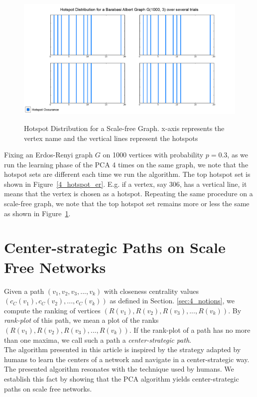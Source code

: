 \documentclass[10pt, conference, compsocconf]{IEEEtran}
\begin{document}
\begin{figure}[htp]
\begin{center}
\includegraphics[scale=0.17]{Results/barabasi.png}\\
\caption{Hotspot Distribution for a Scale-free Graph. x-axis represents the vertex name and the vertical lines represent the hotspots}
\label{4_hotspot_ba}
\end{center}
\end{figure}

Fixing an Erdos-Renyi graph $G$ on 1000 vertices with probability $p=0.3$, as we run the learning phase of the PCA 4 times on the same graph, we note that the hotspot sets are different each time we run the algorithm. The top hotspot set is shown in Figure~\ref{4_hotspot_er}. E.g. if a vertex, say 306, has a vertical line, it means that the vertex is chosen as a hotspot. Repeating the same procedure on a scale-free graph, we note that the top hotspot set remains more or less the same as shown in Figure~\ref{4_hotspot_ba}.\\

\section{Center-strategic Paths on Scale Free Networks}

Given a path $(v_1,v_2,v_3,...,v_k)$ with closeness centrality values $(c_C(v_1),c_C(v_2),...,c_C(v_k))$ as defined in Section. \ref{sec:4_notions}, we compute the ranking of vertices $(R(v_1),R(v_2),R(v_3),...,R(v_k))$. By \emph{rank-plot} of this path, we mean a plot of the ranks $(R(v_1),R(v_2),R(v_3),...,R(v_k))$. If the rank-plot of a path has no more than one maxima, we call such a path a \emph{center-strategic path}.\\

The algorithm presented in this article is inspired by the strategy adapted by humans to learn the centers of a network and navigate in a center-strategic way. The presented algorithm resonates with the technique used by humans. We establish this fact by showing that the PCA algorithm yields center-strategic paths on scale free networks.
\end{document}
